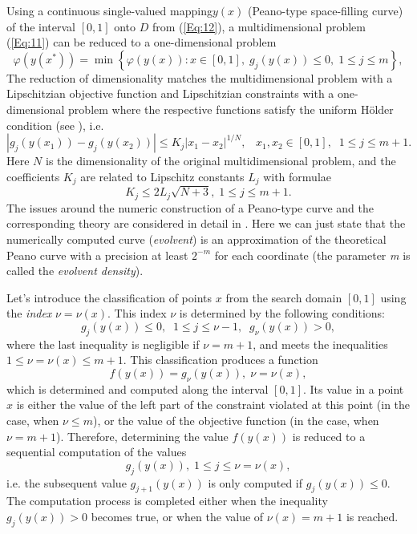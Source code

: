 \documentclass{llncs}
\begin{document}
Using a continuous single-valued mapping$y(x)$ (Peano-type space-filling curve) of the interval  $[0,1]$ onto $D$ from (\ref{Eq:12}), a multidimensional problem (\ref{Eq:11}) can be reduced to a one-dimensional problem
\begin{equation}\label{Eq:13}
\varphi(y(x^\ast))=\min{\left\{\varphi(y(x)): x\in [0,1], \; g_j(y(x))\leq 0, \; 1\leq j\leq m\right\}},
\end{equation}
The reduction of dimensionality matches the multidimensional problem with a Lipschitzian objective function and Lipschitzian constraints with a one-dimensional problem where the respective functions satisfy the uniform H{\"o}lder condition (see \cite{Strongin2000}), i.e. 
\[
\left|g_j(y(x_1))-g_j(y(x_2))\right|\leq K_j\left|x_1-x_2\right|^{1/N}, \;\;\; x_1,x_2\in [0,1], \;\; 1\leq j\leq m+1.
\]
Here $N$ is the dimensionality of the original multidimensional problem, and the coefficients $K_j$ are related to Lipschitz constants $L_j$ with formulae 
\[
K_j\leq 2L_j \sqrt{N+3}, \; 1\leq j\leq m+1.
\]
The issues around the numeric construction of a Peano-type curve and the corresponding theory are considered in detail in \cite{Strongin2000,Sergeyev2013}. Here we can just state that the numerically computed curve (\textit{evolvent}) is an approximation of the theoretical Peano curve with a precision at least $2^{-m}$ for each coordinate (the parameter \textit{m} is called the \textit{evolvent density}).

Let's introduce the classification of points $x$ from the search domain $[0,1]$ using the \textit{index}  $\nu=\nu(x)$. This index $\nu$ is determined by the following conditions:
\[
g_j(y(x))\leq 0, \;\;1 \leq j\leq \nu -1,\;\; g_\nu(y(x))>0,
\]
where the last inequality is negligible if $\nu=m+1$, and meets the inequalities $1\leq \nu=\nu (x) \leq m+1$. This classification produces a function
\[
f(y(x))=g_\nu (y(x)), \; \nu=\nu(x),
\]
which is determined and computed along the interval $[0,1]$. Its value in a point $x$ is either the value of the left part of the constraint violated at this point (in the case, when $\nu \leq m$), or the value of the objective function (in the case, when $\nu = m+1$). Therefore, determining the value $f(y(x))$ is reduced to a sequential computation of the values
\[
g_j(y(x)), \; 1 \leq j \leq \nu=\nu(x),
\]
i.e. the subsequent value $g_{j+1}(y(x))$ is only computed if $g_j(y(x)) \leq 0$. The computation process is completed either when the inequality $g_j(y(x))>0$ becomes true, or when the value of $\nu(x)=m+1$ is reached.
\end{document}
